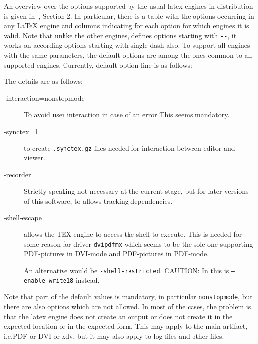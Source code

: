 An overview over the options supported by the usual latex engines in distribution \texlive{} 
is given in~\cite{LatexGen}, Section 2. 
In particular, there is a table with the options occurring in any \LaTeX{} engine 
and columns indicating for each option for which engines it is valid. 
Note that unlike the other engines, \lualatex{} defines options starting with \texttt{-{}-}, 
it works on according options starting with single dash also. 
To support all engines with the same parameters, 
the default options are among the ones common to all supported engines. 
Currently, default option line is as follows: 
%
\begin{center}
  \texttt{\latexToPdfOptions}
\end{center}
%
The details are as follows: 
%
\begin{description}
  \item[{-interaction=nonstopmode}] To avoid user interaction in case of an error 
  This seems mandatory. 
  \item[{-synctex=1}] to create \texttt{.synctex.gz} files needed for interaction between editor and viewer. 
  \item[{-recorder}] Strictly speaking not necessary at the current stage, 
    but for later versions of this software, to allows tracking dependencies. 
  \item[{-shell-escape}] allows the TEX engine to access the shell to execute. 
  This is needed for some reason for driver \texttt{dvipdfmx} 
  which seems to be the sole one supporting 
  PDF-pictures in DVI-mode and PDF-pictures in PDF-mode. 

  An alternative would be \texttt{-shell-restricted}. 
  CAUTION\@: In \miktex{} this is \texttt{--enable-write18} instead. 
\end{description}


Note that part of the default values is mandatory, in particular \texttt{nonstopmode}, 
but there are also options which are not allowed. 
In most of the cases, the problem is that the latex engine does not create an output 
or does not create it in the expected location or in the expected form. 
This may apply to the main artifact, i.e.\@ PDF or DVI or \gls{xdv}, 
but it may also apply to log files and other files. 

